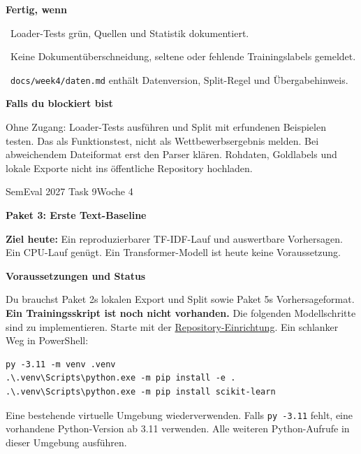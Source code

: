 \documentclass[10pt,a4paper]{article}
\newcommand{\checkbox}{\fbox{\rule{0pt}{2.4mm}\hspace{2.4mm}}}
\newcommand{\planheading}[1]{\par\vspace{9pt}\textbf{#1}\par\vspace{3pt}}
\newcommand{\repolink}[2]{\href{https://github.com/jonaidaydi/semeval-2027-task9-framing/blob/main/#1}{#2}}
\newcommand{\followuptitle}[1]{%
  {\small SemEval 2027 Task 9\hfill Woche 4\par}%
  \vspace{6pt}%
  {\fontsize{16}{19}\selectfont\bfseries #1\par}%
  \vspace{8pt}%
}
\begin{document}
\planheading{Fertig, wenn}
\checkbox\ Loader-Tests grün, Quellen und Statistik dokumentiert.\par
\checkbox\ Keine Dokumentüberschneidung, seltene oder fehlende Trainingslabels gemeldet.\par
\checkbox\ \texttt{docs/week4/daten.md} enthält Datenversion, Split-Regel und Übergabehinweis.

\planheading{Falls du blockiert bist}
Ohne Zugang: Loader-Tests ausführen und Split mit erfundenen Beispielen testen.
Das als Funktionstest, nicht als Wettbewerbsergebnis melden. Bei abweichendem Dateiformat erst den Parser klären.
Rohdaten, Goldlabels und lokale Exporte nicht ins öffentliche Repository hochladen.

\newpage
\hypertarget{plan-text}{}
\followuptitle{Paket 3: Erste Text-Baseline}
\textbf{Ziel heute:} Ein reproduzierbarer TF-IDF-Lauf und auswertbare Vorhersagen.
Ein CPU-Lauf genügt. Ein Transformer-Modell ist heute keine Voraussetzung.

\planheading{Voraussetzungen und Status}
Du brauchst Paket 2s lokalen Export und Split sowie Paket 5s Vorhersageformat.
\textbf{Ein Trainingsskript ist noch nicht vorhanden.} Die folgenden Modellschritte sind zu implementieren.
Starte mit der \repolink{README.md}{Repository-Einrichtung}. Ein schlanker Weg in PowerShell:
\begin{verbatim}
py -3.11 -m venv .venv
.\.venv\Scripts\python.exe -m pip install -e .
.\.venv\Scripts\python.exe -m pip install scikit-learn
\end{verbatim}
Eine bestehende virtuelle Umgebung wiederverwenden. Falls \texttt{py -3.11} fehlt,
eine vorhandene Python-Version ab 3.11 verwenden. Alle weiteren Python-Aufrufe in dieser Umgebung ausführen.
\end{document}
